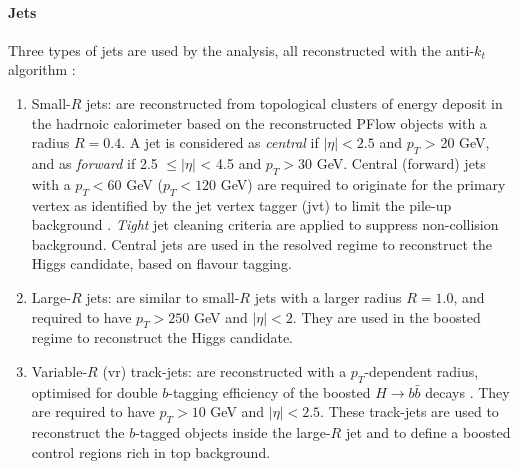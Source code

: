 \paragraph{Jets} Three types of jets are used by the analysis, all reconstructed with the anti-$k_t$ algorithm \cite{Cacciari:2008gp}:
\begin{enumerate}
  \item Small-$R$ jets: are reconstructed from topological clusters of energy deposit in the hadrnoic calorimeter based on the reconstructed PFlow objects with a radius $R = 0.4$. A jet is considered as \textit{central} if $|\eta| < 2.5$ and $p_T$ > 20 GeV, and as \textit{forward} if 2.5 $\leq |\eta|$ < 4.5 and $p_T > 30$ GeV. Central (forward) jets with a $p_T < 60$ GeV ($p_T < 120$ GeV) are required to originate for the primary vertex as identified by the jet vertex tagger (\gls{jvt}) to limit the pile-up background \cite{atlasPUJVT}. \textit{Tight} jet cleaning criteria are applied to suppress non-collision background. Central jets are used in the resolved regime to reconstruct the Higgs candidate, based on flavour tagging. %
  \item Large-$R$ jets: are similar to small-$R$ jets with a larger radius $R = 1.0$, and required to have $p_T > 250$ GeV and $|\eta| < 2$. They are used in the boosted regime to reconstruct the Higgs candidate. 
  \item Variable-$R$ (\gls{vr}) track-jets: are reconstructed with a $p_T$-dependent radius, optimised for double $b$-tagging efficiency of the boosted $H \rightarrow b\bar{b}$ decays \cite{ATL-PHYS-PUB-2017-010}. They are required to have $p_T > 10$ GeV and $|\eta| < 2.5$. These track-jets are used to reconstruct the $b$-tagged objects inside the large-$R$ jet and to define a boosted control regions rich in top background. 
\end{enumerate}

